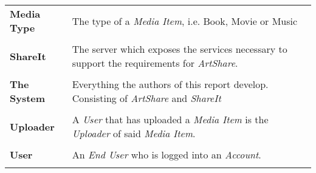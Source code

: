 \documentclass[../report.tex]{subfiles}
\begin{document}
\begin{longtable}{l p{10 cm}}
\textbf{Media Type} & The type of a \textit{Media Item}, i.e. Book, Movie or Music \\ \\
\textbf{ShareIt} & The server which exposes the services necessary to support the requirements for \textit{ArtShare}.\\ \\
\textbf{The System} & Everything the authors of this report develop. Consisting of \textit{ArtShare} and \textit{ShareIt} \\ \\
\textbf{Uploader} & A \textit{User} that has uploaded a \textit{Media Item} is the \textit{Uploader} of said \textit{Media Item}. \\ \\
\textbf{User} & An \textit{End User} who is logged into an \textit{Account}.\\ \\
\end{longtable}
\end{document}
